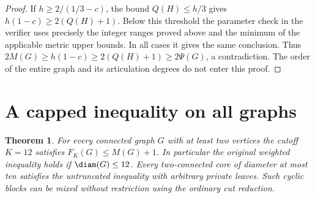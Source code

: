 \documentclass[11pt,a4paper]{article}
\newtheorem{theorem}{Theorem}[section]
\begin{document}
\begin{proof}
If $h\ge2/(1/3-c)$, the bound $Q(H)\le h/3$ gives
$h(1-c)\ge2(Q(H)+1)$. Below this threshold the parameter check
in the verifier uses precisely the integer ranges proved above and
the minimum of the applicable metric upper bounds. In all cases it
gives the same conclusion. Thus
$2M(G)\ge h(1-c)\ge2(Q(H)+1)\ge2\Psi(G)$, a contradiction.
The order of the entire graph and its articulation degrees do not
enter this proof.
\end{proof}

\section{A capped inequality on all graphs}
\begin{theorem}\label{p12-crit:cap12}
For every connected graph $G$ with at least two vertices the cutoff
$K=12$ satisfies $F_K(G)\le M(G)+1$. In particular the
original weighted inequality holds if $\diam(G)\le12$. Every
two-connected core of diameter at most ten satisfies the untruncated
inequality with arbitrary private leaves. Such cyclic blocks can be
mixed without restriction using the ordinary cut reduction.
\end{theorem}
\end{document}

